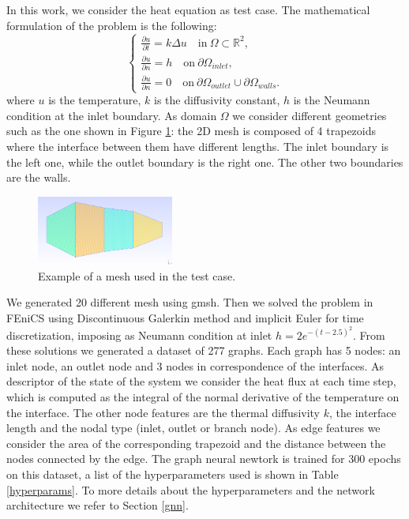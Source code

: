 \documentclass[11pt,a4paper]{article}
\begin{document}
In this work, we consider the heat equation as test case. 
The mathematical formulation of the problem is the following:
\begin{equation}
    \begin{cases}
        \frac{\partial u }{\partial t} = k \Delta u \quad \text{in} \ \Omega \subset \mathbb{R}^2, \\
        \frac{\partial u}{\partial n} = h \quad \text{on} \ \partial \Omega_{inlet}, \\
        \frac{\partial u}{\partial n} = 0 \quad \text{on} \ \partial \Omega_{outlet} 
        \cup \partial \Omega_{walls}.
    \end{cases}
\end{equation}
where \(u\) is the temperature, \(k\) is the diffusivity constant, \(h\) is the Neumann condition at the inlet boundary. As domain \(\Omega\) we consider different geometries such as the one shown in Figure \ref{mesh}: the 2D mesh is composed of 4 trapezoids where the interface between them have different lengths. The inlet boundary is the left one, while the outlet boundary is the right one. The other two boundaries are the walls.

\begin{figure}[H]
    \centering
    \includegraphics[width=0.4\textwidth]{Images/mesh.png}
    \caption{Example of a mesh used in the test case.}
    \label{mesh}
\end{figure}

We generated 20 different mesh using gmsh. 
Then we solved the problem in FEniCS using Discontinuous Galerkin method and implicit Euler for time discretization, imposing as Neumann condition at inlet \(h = 2e^{-(t-2.5)^2}\).
From these solutions we generated a dataset of 277 graphs. 
Each graph has 5 nodes: an inlet node, an outlet node and 3 nodes in correspondence of the interfaces. 
As descriptor of the state of the system we consider the heat flux at each time step, which is computed as the integral of the normal derivative of the temperature on the interface. The other node features are the thermal diffusivity \(k\), the interface length and the nodal type (inlet, outlet or branch node). 
As edge features we consider the area of the corresponding trapezoid and the distance between the nodes connected by the edge. 
The graph neural newtork is trained for 300 epochs on this dataset, a list of the hyperparameters used is shown in Table \ref{hyperparams}. To more details about the hyperparameters and the network architecture we refer to Section \ref{gnn}.
\end{document}
